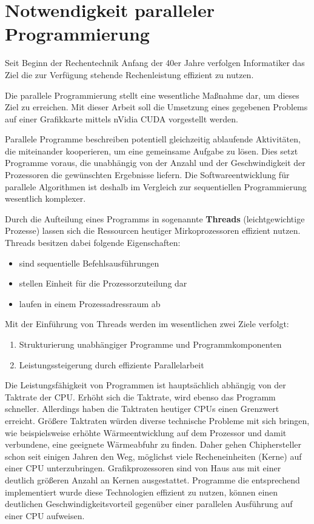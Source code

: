
\chapter{Notwendigkeit paralleler Programmierung}
\label{intro}
Seit Beginn der Rechentechnik Anfang der 40er Jahre verfolgen Informatiker das Ziel die zur Verfügung stehende Rechenleistung effizient zu nutzen.

Die parallele Programmierung stellt eine wesentliche Maßnahme dar, um dieses Ziel zu erreichen. Mit dieser Arbeit  soll die Umsetzung eines gegebenen Problems auf einer Grafikkarte mittels nVidia CUDA vorgestellt werden.

Parallele Programme beschreiben potentiell gleichzeitig ablaufende Aktivitäten, die miteinander kooperieren, um eine gemeinsame Aufgabe zu lösen. Dies setzt Programme voraus, die unabhängig von der Anzahl und der Geschwindigkeit der Prozessoren die gewünschten Ergebnisse liefern. Die Softwareentwicklung für parallele Algorithmen ist deshalb im Vergleich zur sequentiellen Programmierung wesentlich komplexer.

Durch die Aufteilung eines Programms in sogenannte \textbf{Threads} (\glqq leichtgewichtige Prozesse\grqq) lassen sich die Ressourcen heutiger Mirkoprozessoren effizient nutzen.
Threads besitzen dabei folgende Eigenschaften:
\begin{itemize}
\item sind sequentielle Befehlsausführungen
\item stellen Einheit für die Prozessorzuteilung dar
\item laufen in einem Prozessadressraum ab
\end{itemize}
Mit der Einführung von Threads werden im wesentlichen zwei Ziele verfolgt:
\begin{enumerate}
\item Strukturierung unabhängiger Programme und Programmkomponenten
\item Leistungssteigerung durch effiziente Parallelarbeit
\end{enumerate}

Die Leistungsfähigkeit von Programmen ist hauptsächlich abhängig von der Taktrate der CPU. Erhöht sich die Taktrate, wird ebenso das Programm schneller.
Allerdings haben die Taktraten heutiger CPUs einen Grenzwert erreicht.
Größere Taktraten würden diverse technische Probleme mit sich bringen, wie beispielsweise erhöhte Wärmeentwicklung auf dem Prozessor und damit verbundene, eine geeignete Wärmeabfuhr zu finden.
Daher gehen Chiphersteller schon seit einigen Jahren den Weg, möglichst viele Recheneinheiten (Kerne) auf einer CPU unterzubringen. Grafikprozessoren sind von Haus aus mit einer deutlich größeren Anzahl an Kernen ausgestattet.
Programme die entsprechend implementiert wurde diese Technologien effizient zu nutzen, können einen deutlichen Geschwindigkeitsvorteil gegenüber einer parallelen Ausführung auf einer CPU aufweisen.


